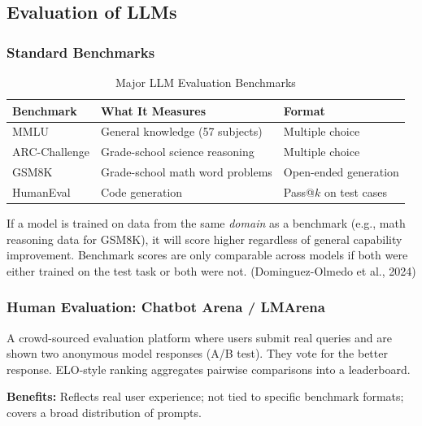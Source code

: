 \documentclass[11pt, a4paper]{article}
\begin{document}
\subsection{Evaluation of LLMs}

\subsubsection{Standard Benchmarks}

\begin{table}[h]
\centering
\caption{Major LLM Evaluation Benchmarks}
\begin{tabular}{@{}lll@{}}
\toprule
\textbf{Benchmark} & \textbf{What It Measures} & \textbf{Format} \\
\midrule
MMLU & General knowledge (57 subjects) & Multiple choice \\
ARC-Challenge & Grade-school science reasoning & Multiple choice \\
GSM8K & Grade-school math word problems & Open-ended generation \\
HumanEval & Code generation & Pass@$k$ on test cases \\
\bottomrule
\end{tabular}
\end{table}

\begin{warnbox}
If a model is trained on data from the same \emph{domain} as a benchmark (e.g., math reasoning data for GSM8K), it will score higher regardless of general capability improvement. Benchmark scores are only comparable across models if both were either trained on the test task or both were not. (Dominguez-Olmedo et al., 2024)
\end{warnbox}

\subsubsection{Human Evaluation: Chatbot Arena / LMArena}

\begin{defbox}
A crowd-sourced evaluation platform where users submit real queries and are shown two anonymous model responses (A/B test). They vote for the better response. ELO-style ranking aggregates pairwise comparisons into a leaderboard.

\textbf{Benefits:} Reflects real user experience; not tied to specific benchmark formats; covers a broad distribution of prompts.
\end{defbox}
\end{document}
